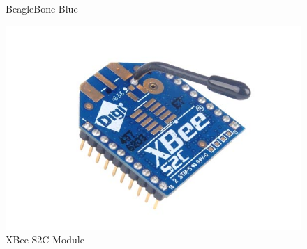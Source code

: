\begin{figure}
\begin{minipage}[t]{0.32\textwidth}
    \captionsetup{width=\textwidth}
    \caption{BeagleBone Blue}
    \label{fig:beagleboneBlue}
  \end{minipage}
  \begin{minipage}[t]{0.32\textwidth}
    \includegraphics[width=1\textwidth]{figs/img/Xbee-S2C-Module}
    \captionsetup{width=\textwidth}
    \caption{XBee S2C Module}
    \label{fig:XBeeModule}
  \end{minipage}
\end{figure}


